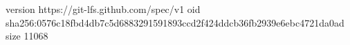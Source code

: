 version https://git-lfs.github.com/spec/v1
oid sha256:0576c18fbd4db7c5d6883291591893ccd2f424ddcb36fb2939e6ebc4721da0ad
size 11068
